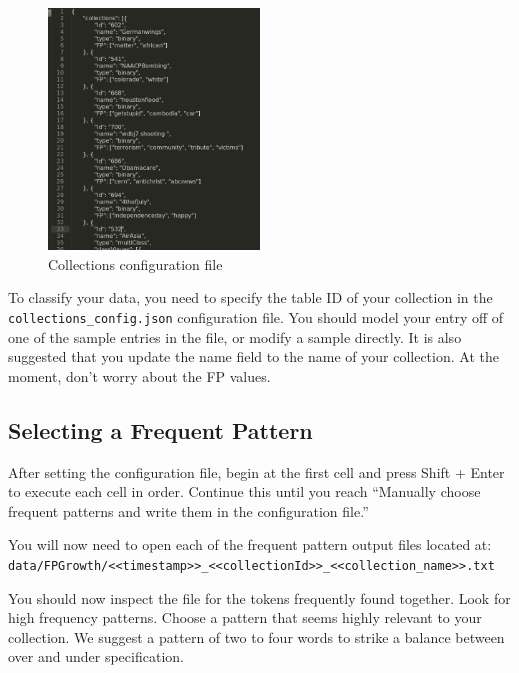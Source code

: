 \begin{figure}[th!]
	\centering
	\includegraphics[width=0.5\textwidth]{figures/collection_config}
    \caption{Collections configuration file}\label{fig:collection_config}
\end{figure}


To classify your data, you need to specify the table ID of your collection in the \texttt{collections\_config.json} configuration file. You should model your entry off of one of the sample entries in the file, or modify a sample directly. It is also suggested that you update the name field to the name of your collection. At the moment, don't worry about the FP values.

\subsection{Selecting a Frequent Pattern}

After setting the configuration file, begin at the first cell and press Shift + Enter to execute each cell in order. Continue this until you reach ``Manually choose frequent patterns and write them in the configuration file.''

You will now need to open each of the frequent pattern output files located at:\\
\texttt{data/FPGrowth/<<timestamp>>\_<<collectionId>>\_<<collection\_name>>.txt}

You should now inspect the file for the tokens frequently found together. Look for high frequency patterns. Choose a pattern that seems highly relevant to your collection. We suggest a pattern of two to four words to strike a balance between over and under specification.

